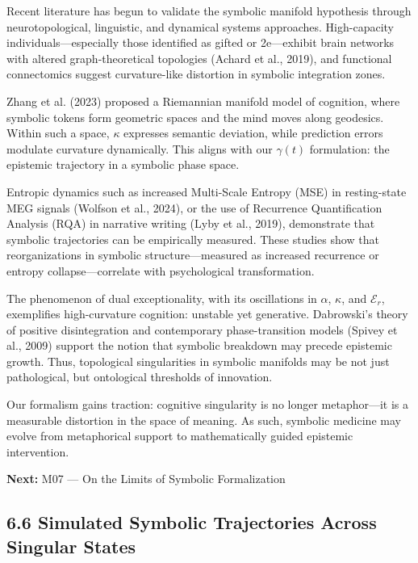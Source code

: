 Recent literature has begun to validate the symbolic manifold hypothesis through neurotopological, linguistic, and dynamical systems approaches. High-capacity individuals—especially those identified as gifted or 2e—exhibit brain networks with altered graph-theoretical topologies (Achard et al., 2019)\cite{Achard2019}, and functional connectomics suggest curvature-like distortion in symbolic integration zones.

Zhang et al. (2023)\cite{Zhang2023} proposed a Riemannian manifold model of cognition, where symbolic tokens form geometric spaces and the mind moves along geodesics. Within such a space, $\kappa$ expresses semantic deviation, while prediction errors modulate curvature dynamically. This aligns with our $\gamma(t)$ formulation: the epistemic trajectory in a symbolic phase space.

Entropic dynamics such as increased Multi-Scale Entropy (MSE) in resting-state MEG signals (Wolfson et al., 2024)\cite{Wolfson2024}, or the use of Recurrence Quantification Analysis (RQA) in narrative writing (Lyby et al., 2019)\cite{Lyby2019}, demonstrate that symbolic trajectories can be empirically measured. These studies show that reorganizations in symbolic structure—measured as increased recurrence or entropy collapse—correlate with psychological transformation.

The phenomenon of dual exceptionality, with its oscillations in $\alpha$, $\kappa$, and $\mathcal{E}_r$, exemplifies high-curvature cognition: unstable yet generative. Dabrowski's theory of positive disintegration and contemporary phase-transition models (Spivey et al., 2009)\cite{Spivey2009} support the notion that symbolic breakdown may precede epistemic growth. Thus, topological singularities in symbolic manifolds may be not just pathological, but ontological thresholds of innovation.

Our formalism gains traction: cognitive singularity is no longer metaphor—it is a measurable distortion in the space of meaning. As such, symbolic medicine may evolve from metaphorical support to mathematically guided epistemic intervention.

\bigskip
\noindent
\textbf{Next:} M07 — On the Limits of Symbolic Formalization


\subsection*{6.6 Simulated Symbolic Trajectories Across Singular States}

